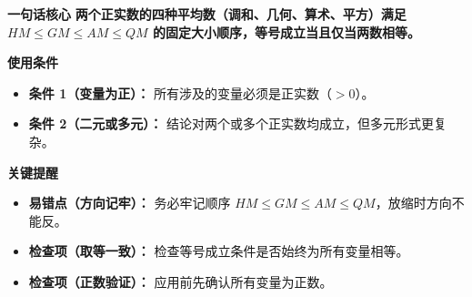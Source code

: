 \begin{summarybox}
\textbf{\textcolor{CSummary}{一句话核心}}
\textbf{两个正实数的四种平均数（调和、几何、算术、平方）满足 $HM \le GM \le AM \le QM$ 的固定大小顺序，等号成立当且仅当两数相等。}

\medskip
\textbf{\textcolor{CSummary}{使用条件}}
\begin{itemize}[leftmargin=*, itemsep=0.5em, topsep=0.4em]
    \item \textbf{条件 1（变量为正）：} 所有涉及的变量必须是正实数（$>0$）。
    \item \textbf{条件 2（二元或多元）：} 结论对两个或多个正实数均成立，但多元形式更复杂。
\end{itemize}

\medskip
\textbf{\textcolor{CSummary}{关键提醒}}
\begin{itemize}[leftmargin=*, itemsep=0.5em, topsep=0.4em]
    \item \textbf{易错点（方向记牢）：} 务必牢记顺序 $HM \le GM \le AM \le QM$，放缩时方向不能反。
    \item \textbf{检查项（取等一致）：} 检查等号成立条件是否始终为所有变量相等。
    \item \textbf{检查项（正数验证）：} 应用前先确认所有变量为正数。
\end{itemize}
\end{summarybox}
